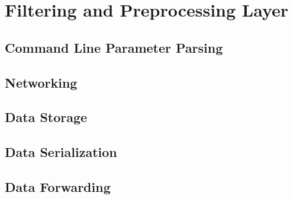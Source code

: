 \chapter{Filtering and Preprocessing Layer}
\label{ch:faps}

\section{Command Line Parameter Parsing}


\section{Networking}


\section{Data Storage}


\section{Data Serialization}


\section{Data Forwarding}

